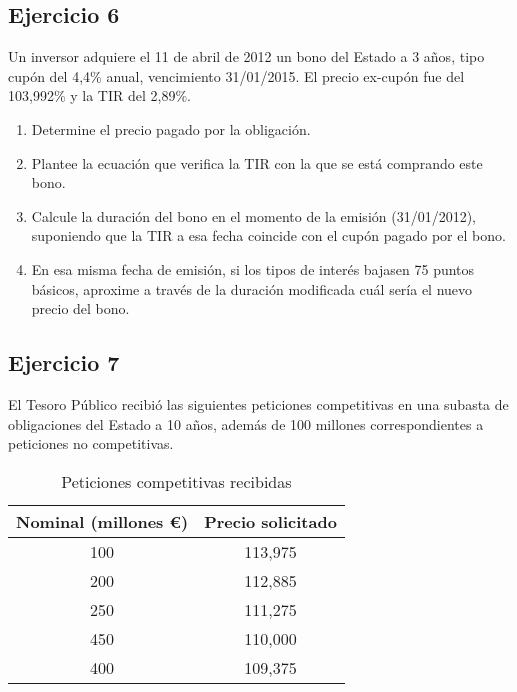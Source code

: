 \subsection*{Ejercicio 6}

Un inversor adquiere el 11 de abril de 2012 un bono del Estado a 3 años, tipo cupón del 4,4\% anual, vencimiento 31/01/2015. El precio ex-cupón fue del 103,992\% y la TIR del 2,89\%.

\begin{enumerate}[label=\textbf{\alph*)}]
    \item Determine el precio pagado por la obligación.
    \item Plantee la ecuación que verifica la TIR con la que se está comprando este bono.
    \item Calcule la duración del bono en el momento de la emisión (31/01/2012), suponiendo que la TIR a esa fecha coincide con el cupón pagado por el bono.
    \item En esa misma fecha de emisión, si los tipos de interés bajasen 75 puntos básicos, aproxime a través de la duración modificada cuál sería el nuevo precio del bono.
\end{enumerate}



\subsection*{Ejercicio 7 }

El Tesoro Público recibió las siguientes peticiones competitivas en una subasta de obligaciones del Estado a 10 años, además de 100 millones correspondientes a peticiones no competitivas.

\begin{table}[H]
\centering
\begin{tabular}{|c|c|}
\hline
Nominal (millones €) & Precio solicitado \\ \hline
100                  & 113,975           \\ \hline
200                  & 112,885           \\ \hline
250                  & 111,275           \\ \hline
450                  & 110,000           \\ \hline
400                  & 109,375           \\ \hline
\end{tabular}
\caption{Peticiones competitivas recibidas}
\end{table}

